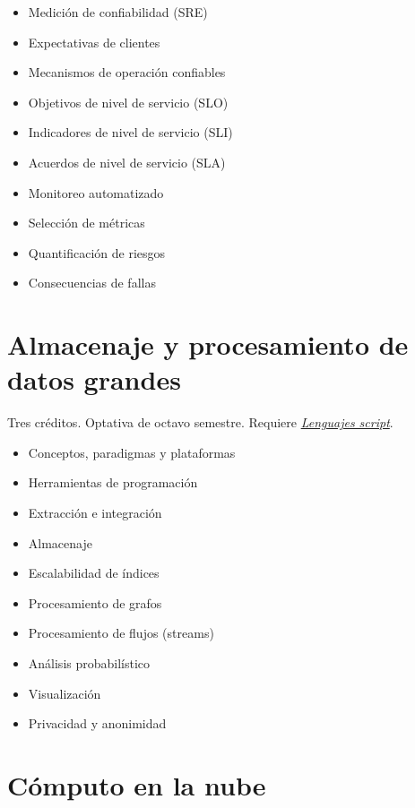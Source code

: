 \documentclass{article}
\begin{document}
\begin{multicols}{4}
\begin{itemize}
\item{Medici\'{o}n de confiabilidad (SRE)}
\item{Expectativas de clientes}
\item{Mecanismos de operaci\'{o}n confiables}
\item{Objetivos de nivel de servicio (SLO)}
\item{Indicadores de nivel de servicio (SLI)}
\item{Acuerdos de nivel de servicio (SLA)}
\item{Monitoreo automatizado}
\item{Selecci\'{o}n de m\'{e}tricas}
\item{Quantificaci\'{o}n de riesgos}
\item{Consecuencias de fallas}
\end{itemize}

\vfill\null \columnbreak

\hypertarget{ayp}{\section*{Almacenaje y procesamiento de datos grandes}}

Tres cr\'{e}ditos.
Optativa de octavo semestre. Requiere
\hyperlink{ls}{\em Lenguajes script}.

\begin{itemize}
\item{Conceptos, paradigmas y plataformas}
\item{Herramientas de programaci\'{o}n}
\item{Extracci\'{o}n e integraci\'{o}n}
\item{Almacenaje}
\item{Escalabilidad de \'{i}ndices}
\item{Procesamiento de grafos}
\item{Procesamiento de flujos (streams)}
\item{An\'{a}lisis probabil\'{i}stico}
\item{Visualizaci\'{o}n}
\item{Privacidad y anonimidad}
\end{itemize}

\vfill\null \columnbreak

\hypertarget{celn}{\section*{C\'{o}mputo en la nube}} 


\end{multicols}
\end{document}
